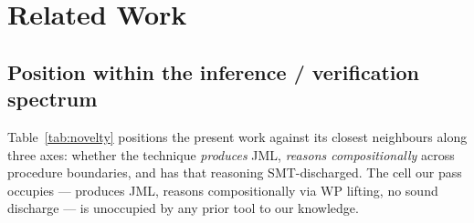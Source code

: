 \section{Related Work}
\label{sec:related}

\subsection{Position within the inference / verification spectrum}

Table~\ref{tab:novelty} positions the present work against its
closest neighbours along three axes: whether the technique
\emph{produces} JML, \emph{reasons compositionally} across procedure
boundaries, and has that reasoning SMT-discharged. The cell our pass
occupies --- produces JML, reasons compositionally via WP lifting, no
sound discharge --- is unoccupied by any prior tool to our knowledge.

